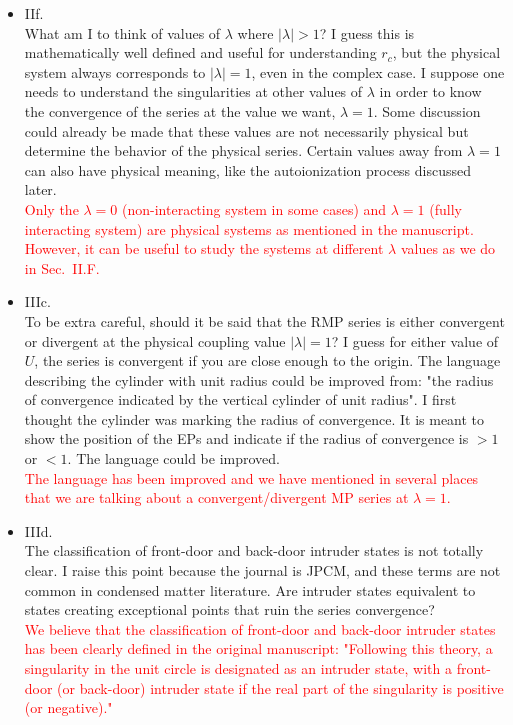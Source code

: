 \documentclass[10pt]{letter}
\newcommand{\alert}[1]{\textcolor{red}{#1}}
\begin{document}
\begin{letter}
\begin{itemize}
\item 
	{IIf.\\
	What am I to think of values of $\lambda$ where $|\lambda|>1$? 
	I guess this is mathematically well defined and useful for understanding $r_c$, but the physical system always corresponds to $|\lambda|=1$, even in the complex case. 
	I suppose one needs to understand the singularities at other values of $\lambda$ in order to know the convergence of the series at the value we want, $\lambda = 1$.
	Some discussion could already be made that these values are not necessarily physical but determine the behavior of the physical series. 
	Certain values away from $\lambda=1$ can also have physical meaning, like the autoionization process discussed later.}
	\\
	\alert{Only the $\lambda = 0$ (non-interacting system in some cases) and $\lambda = 1$ (fully interacting system) are physical systems  as mentioned in the manuscript.
	However, it can be useful to study the systems at different $\lambda$ values as we do in Sec.~II.F.}

\item 
	{IIIc.\\
	To be extra careful, should it be said that the RMP series is either convergent or divergent at the physical coupling value $|\lambda|=1$? 
	I guess for either value of $U$, the series is convergent if you are close enough to the origin.
	The language describing the cylinder with unit radius could be improved from: "the radius of convergence indicated by the vertical cylinder of unit radius".
	I first thought the cylinder was marking the radius of convergence. It is meant to show the position of the EPs and indicate if the radius of convergence is $>1$ or $<1$. 
	The language could be improved.}
	\\
	\alert{The language has been improved and we have mentioned in several places that we are talking about a convergent/divergent MP series at $\lambda = 1$.}

\item 
	{IIId.\\
	The classification of front-door and back-door intruder states is not totally clear. 
	I raise this point because the journal is JPCM, and these terms are not common in condensed matter literature. 
	Are intruder states equivalent to states creating exceptional points that ruin the series convergence?}
	\\
	\alert{We believe that the classification of front-door and back-door intruder states has been clearly defined in the original manuscript: 
	"Following this theory, a singularity in the unit circle is designated as an intruder state, with a front-door (or back-door) intruder state if the real part of the singularity is positive (or negative)."}


\end{itemize}
\end{letter}
\end{document}
